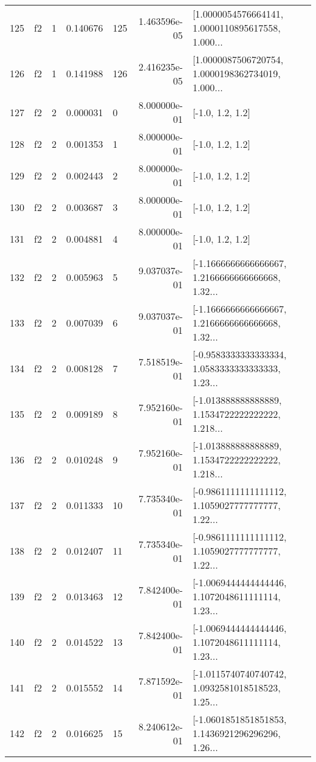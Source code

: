 \begin{tabular}{lllrlrl}
125 &  f2 &   1 &  0.140676 &  125 &  1.463596e-05 &  [1.0000054576664141, 1.0000110895617558, 1.000... \\
126 &  f2 &   1 &  0.141988 &  126 &  2.416235e-05 &  [1.0000087506720754, 1.0000198362734019, 1.000... \\
127 &  f2 &   2 &  0.000031 &    0 &  8.000000e-01 &                                   [-1.0, 1.2, 1.2] \\
128 &  f2 &   2 &  0.001353 &    1 &  8.000000e-01 &                                   [-1.0, 1.2, 1.2] \\
129 &  f2 &   2 &  0.002443 &    2 &  8.000000e-01 &                                   [-1.0, 1.2, 1.2] \\
130 &  f2 &   2 &  0.003687 &    3 &  8.000000e-01 &                                   [-1.0, 1.2, 1.2] \\
131 &  f2 &   2 &  0.004881 &    4 &  8.000000e-01 &                                   [-1.0, 1.2, 1.2] \\
132 &  f2 &   2 &  0.005963 &    5 &  9.037037e-01 &  [-1.1666666666666667, 1.2166666666666668, 1.32... \\
133 &  f2 &   2 &  0.007039 &    6 &  9.037037e-01 &  [-1.1666666666666667, 1.2166666666666668, 1.32... \\
134 &  f2 &   2 &  0.008128 &    7 &  7.518519e-01 &  [-0.9583333333333334, 1.0583333333333333, 1.23... \\
135 &  f2 &   2 &  0.009189 &    8 &  7.952160e-01 &  [-1.013888888888889, 1.1534722222222222, 1.218... \\
136 &  f2 &   2 &  0.010248 &    9 &  7.952160e-01 &  [-1.013888888888889, 1.1534722222222222, 1.218... \\
137 &  f2 &   2 &  0.011333 &   10 &  7.735340e-01 &  [-0.9861111111111112, 1.1059027777777777, 1.22... \\
138 &  f2 &   2 &  0.012407 &   11 &  7.735340e-01 &  [-0.9861111111111112, 1.1059027777777777, 1.22... \\
139 &  f2 &   2 &  0.013463 &   12 &  7.842400e-01 &  [-1.0069444444444446, 1.1072048611111114, 1.23... \\
140 &  f2 &   2 &  0.014522 &   13 &  7.842400e-01 &  [-1.0069444444444446, 1.1072048611111114, 1.23... \\
141 &  f2 &   2 &  0.015552 &   14 &  7.871592e-01 &  [-1.0115740740740742, 1.0932581018518523, 1.25... \\
142 &  f2 &   2 &  0.016625 &   15 &  8.240612e-01 &  [-1.0601851851851853, 1.1436921296296296, 1.26... \\

\end{tabular}
